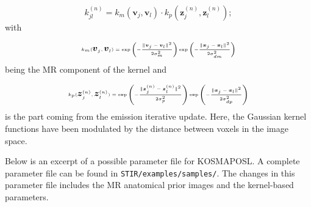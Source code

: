 \documentclass{article}
\begin{document}
  \[
    k^{(n)}_{jl} = k_m(\boldsymbol{v}_j,\boldsymbol{v}_l) \cdot k_p(\boldsymbol{z}^{(n)}_j,\boldsymbol{z}^{(n)}_l);
  \]
  \noindent
  with

  \[
   k_m(\boldsymbol{v}_j,\boldsymbol{v}_l) = \exp \left(\tiny - \frac{\|  \boldsymbol{v}_j-\boldsymbol{v}_l \|^2}{2 \sigma_m^2} \right) \exp \left(- \frac{\tiny \|  \boldsymbol{x}_j-\boldsymbol{x}_l \|^2}{ \tiny 2 \sigma_{dm}^2} \right)
  \]
  \noindent
  being the MR component of the kernel and

  \[
   k_p(\boldsymbol{z}^{(n)}_j,\boldsymbol{z}^{(n)}_l) = \exp \left(\tiny - \frac{\|  \boldsymbol{z}^{(n)}_j-\boldsymbol{z}^{(n)}_l \|^2}{2 \sigma_p^2} \right) \exp \left(\tiny - \frac{\|  \boldsymbol{x}_j-\boldsymbol{x}_l \|^2}{ \tiny{2 \sigma_{dp}^2}} \right)
  \]
  \noindent
  is the part coming from the emission iterative update. Here, the Gaussian kernel functions have been modulated by the distance between voxels in the image space.

Below is an excerpt of a possible parameter file for KOSMAPOSL. A complete parameter file
can be found in \texttt{STIR/examples/samples/}. The changes in this parameter file includes the MR anatomical prior images and the kernel-based parameters. 
\end{document}
